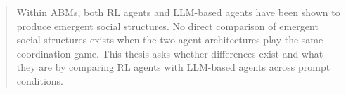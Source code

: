 
\begin{abstract}
Within ABMs, both RL agents and LLM-based agents have been shown to produce emergent social structures. No direct comparison of emergent social structures exists when the two agent architectures play the same coordination game. This thesis asks whether differences exist and what they are by comparing RL agents with LLM-based agents across prompt conditions.
\end{abstract}
